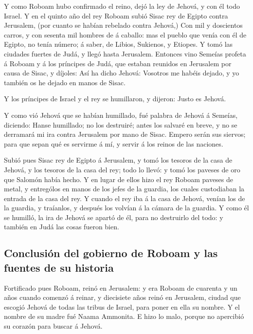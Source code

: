  Y como Roboam hubo confirmado el reino, dejó la ley de
Jehová, y con él todo Israel.  Y en el quinto año del rey
Roboam subió Sisac rey de Egipto contra Jerusalem, (por cuanto se habían
rebelado contra Jehová,)  Con mil y doscientos carros, y con
sesenta mil hombres de á caballo: mas el pueblo que venía con él de
Egipto, no tenía número; á saber, de Libios, Sukienos, y Etiopes.
 Y tomó las ciudades fuertes de Judá, y llegó hasta
Jerusalem.  Entonces vino Semeías profeta á Roboam y á los
príncipes de Judá, que estaban reunidos en Jerusalem por causa de Sisac,
y díjoles: Así ha dicho Jehová: Vosotros me habéis dejado, y yo también
os he dejado en manos de Sisac.

 Y los príncipes de Israel y el rey se humillaron, y
dijeron: Justo es Jehová.

 Y como vió Jehová que se habían humillado, fué palabra de
Jehová á Semeías, diciendo: Hanse humillado; no los destruiré; antes los
salvaré en breve, y no se derramará mi ira contra Jerusalem por mano de
Sisac.  Empero serán sus siervos; para que sepan qué es
servirme á mí, y servir á los reinos de las naciones.

 Subió pues Sisac rey de Egipto á Jerusalem, y tomó los
tesoros de la casa de Jehová, y los tesoros de la casa del rey; todo lo
llevó: y tomó los paveses de oro que Salomón había hecho. 
Y en lugar de ellos hizo el rey Roboam paveses de metal, y entrególos en
manos de los jefes de la guardia, los cuales custodiaban la entrada de
la casa del rey.  Y cuando el rey iba á la casa de Jehová,
venían los de la guardia, y traíanlos, y después los volvían á la cámara
de la guardia.  Y como él se humilló, la ira de Jehová se
apartó de él, para no destruirlo del todo: y también en Judá las cosas
fueron bien.

\hypertarget{conclusiuxf3n-del-gobierno-de-roboam-y-las-fuentes-de-su-historia}{%
\subsection{Conclusión del gobierno de Roboam y las fuentes de su
historia}\label{conclusiuxf3n-del-gobierno-de-roboam-y-las-fuentes-de-su-historia}}

 Fortificado pues Roboam, reinó en Jerusalem: y era Roboam
de cuarenta y un años cuando comenzó á reinar, y diecisiete años reinó
en Jerusalem, ciudad que escogió Jehová de todas las tribus de Israel,
para poner en ella su nombre. Y el nombre de su madre fué Naama
Ammonita.  E hizo lo malo, porque no apercibió su corazón
para buscar á Jehová.

